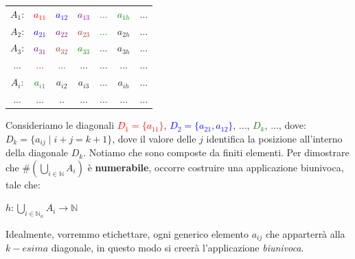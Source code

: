 \begin{center}
    \begin{tabular}{ccccccc}
        $A_1$: & \textcolor{red}{$a_{11}$} & \textcolor{blue}{$a_{12}$} & \textcolor{purple}{$a_{13}$} & \textcolor{brown}{...} & \textcolor{green}{$a_{1h}$} & ... \\
        $A_2$: & \textcolor{blue}{$a_{21}$} & \textcolor{purple}{$a_{22}$} & \textcolor{brown}{$a_{23}$} & \textcolor{green}{...} & $a_{2h}$ & ... \\
        $A_3$: & \textcolor{purple}{$a_{31}$} & \textcolor{brown}{$a_{32}$} & \textcolor{green}{$a_{33}$} & ... & $a_{3h}$ & ... \\
        ... & \textcolor{brown}{...} & \textcolor{green}{...} & ... & ... & ... & ... \\
        $A_i$: & \textcolor{green}{$a_{i1}$} & $a_{i2}$ & $a_{i3}$ & ... & $a_{ih}$ & ... \\
        ... & ... & .. & ... & ... & ... & ... \\
    \end{tabular}
\end{center}
Consideriamo le diagonali \textcolor{red}{$D_1=\{a_{11}\}$}, \textcolor{blue}{$D_2=\{a_{21}, a_{12}\}$}, ..., \textcolor{green}{$D_k$}, ..., dove: $D_k = \{a_{ij} \; | \; i + j = k + 1\}$, dove il valore delle $j$ identifica la posizione all'interno della diagonale $D_k$. Notiamo che sono composte da finiti elementi. Per dimostrare che $\#(\bigcup_{i \in \mathbb{N}}A_i)$ è \textbf{numerabile}, occorre costruire una applicazione biunivoca, tale che:
\begin{center}
    $h : \bigcup_{i \in \mathbb{N}_n} A_i \rightarrow \mathbb{N}$
\end{center}
Idealmente, vorremmo etichettare, ogni generico elemento $a_{ij}$ che apparterrà alla $k-esima$ diagonale, in questo modo si creerà l'applicazione \textit{biunivoca}.

